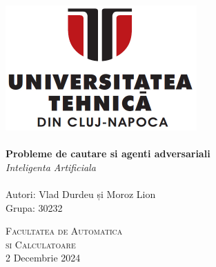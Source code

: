 \begin{titlepage}
\begin{center}

\includegraphics[width=0.55\textwidth]{resources/utcn_logo.jpg}~\\[2cm]

\HRule \\[0.4cm]
{ \LARGE
    \textbf{Probleme de cautare si agenti adversariali}\\[0.4cm]
    \emph{Inteligenta Artificiala}\\[0.4cm]
}
\HRule \\[1.5cm]

{ \large
    Autori: Vlad Durdeu și Moroz Lion \\[0.1cm]
    Grupa: 30232\\[0.1cm]
}

\vfill
\textsc{\large Facultatea de Automatica\\si Calculatoare}\\[0.4cm]

{\large 2 Decembrie 2024}
    
\end{center}
\end{titlepage}